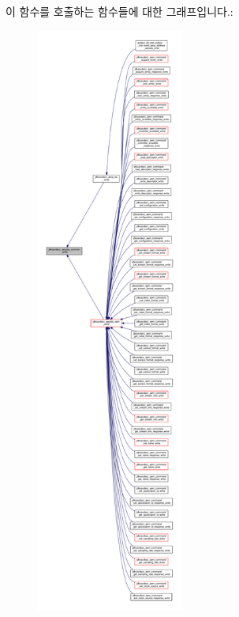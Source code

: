 이 함수를 호출하는 함수들에 대한 그래프입니다.\+:
\nopagebreak
\begin{figure}[H]
\begin{center}
\leavevmode
\includegraphics[height=550pt]{group__aecpdu__common_gac85377ae2518276697173afa5db77526_icgraph}
\end{center}
\end{figure}


